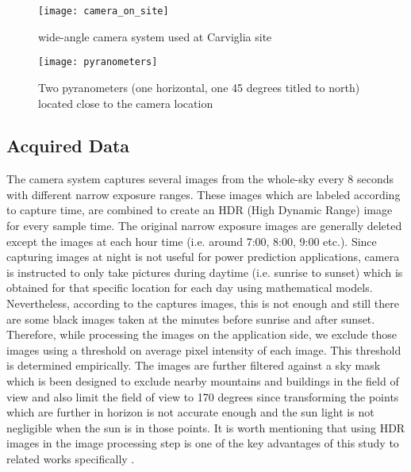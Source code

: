 \begin{figure}[h]
\caption{wide-angle camera system used at Carviglia site}
\label{fig:camera_on_site}
\texttt{[image: camera\_on\_site]}
\centering
\end{figure} 

\begin{figure}[h]
\caption{Two pyranometers (one horizontal, one 45 degrees titled to north) located close to the camera location}
\label{fig:pyranometers}
\texttt{[image: pyranometers]}
\centering
\end{figure} 

\subsection{Acquired Data}
The camera system captures several images from the whole-sky every 8 seconds with different narrow exposure ranges. These images which are labeled according to capture time, are combined to create an HDR (High Dynamic Range) image for every sample time. The original narrow exposure images are generally deleted except the images at each hour time (i.e. around 7:00, 8:00, 9:00 etc.). Since capturing images at night is not useful for power prediction applications, camera is instructed to only take pictures during daytime (i.e. sunrise to sunset) which is obtained for that specific location for each day using mathematical models. Nevertheless, according to the captures images, this is not enough and still there are some black images taken at the minutes before sunrise and after sunset. Therefore, while processing the images on the application side, we exclude those images using a threshold on average pixel intensity of each image. This threshold is determined empirically. The images are further filtered against a sky mask which is been designed to exclude nearby mountains and buildings in the field of view and also limit the field of view to 170 degrees since transforming the points which are further in horizon is not accurate enough and the sun light is not negligible when the sun is in those points.  It is worth mentioning that using HDR images in the image processing step is one of the key advantages of this study to related works specifically \cite{tSchmidt15}.

